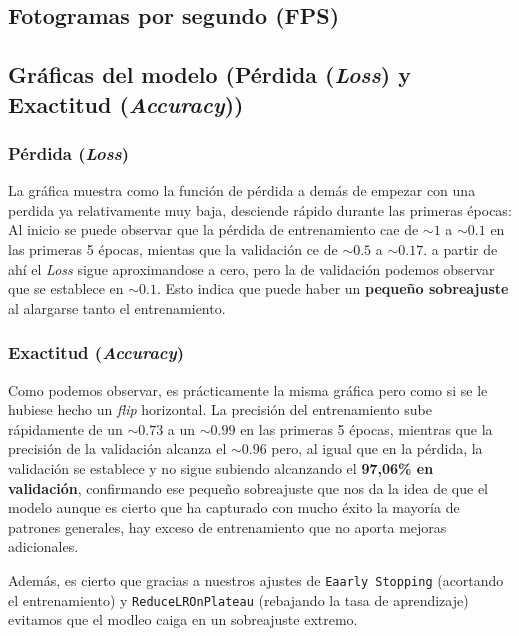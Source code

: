 \subsection{Fotogramas por segundo (FPS)}



\subsection{Gráficas del modelo (Pérdida (\textit{Loss}) y Exactitud (\textit{Accuracy}))}

\subsubsection{Pérdida (\textit{Loss})}
La gráfica muestra como la función de pérdida a demás de empezar con una perdida ya relativamente muy baja, desciende rápido durante las primeras épocas: Al inicio se puede observar que la pérdida de entrenamiento cae de $\sim 1$ a $\sim 0.1$ en las primeras 5 épocas, mientas que la validación ce de $\sim 0.5$ a $\sim 0.17$. a partir de ahí el \textit{Loss} sigue aproximandose a cero, pero la de validación podemos observar que se establece en $\sim 0.1$. Esto indica que puede haber un \textbf{pequeño sobreajuste} al alargarse tanto el entrenamiento.

\subsubsection{Exactitud (\textit{Accuracy})}
Como podemos observar, es prácticamente la misma gráfica pero como si se le hubiese hecho un \textit{flip} horizontal. La precisión del entrenamiento sube rápidamente de un $\sim 0.73$ a un $\sim 0.99$ en las primeras 5 épocas, mientras que la precisión de la validación alcanza el $\sim 0.96$ pero, al igual que en la pérdida, la validación se establece y no sigue subiendo alcanzando el \textbf{97,06\% en validación}, confirmando ese pequeño sobreajuste que nos da la idea de que el modelo aunque es cierto que ha capturado con mucho éxito la mayoría de patrones generales, hay exceso de entrenamiento que no aporta mejoras adicionales. 

Además, es cierto que gracias a nuestros ajustes de \texttt{Eaarly Stopping} (acortando el entrenamiento) y \texttt{ReduceLROnPlateau} (rebajando la tasa de aprendizaje) evitamos que el modleo caiga en un sobreajuste extremo.

